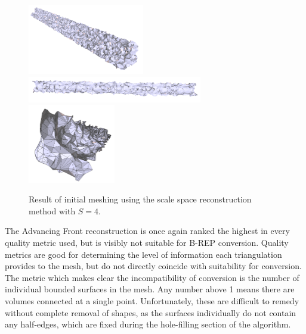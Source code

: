 \documentclass[12pt]{drexelthesis}
\begin{document}
\begin{figure}[!ht]
	
	\centering
		\includegraphics[width=2in]{simulated-lab-scan/2cmnoise/2cmmesh/scalespace400.png}
		\includegraphics[width=3in]{simulated-lab-scan/2cmnoise/2cmmesh/scalespace401.png}
		\includegraphics[width=1.5in]{simulated-lab-scan/2cmnoise/2cmmesh/scalespace402.png}
		\caption[Initial meshing using a scale space reconstruction with $S = 4$]{\centering  Result of initial meshing using the scale space reconstruction method with $S = 4$.}
		\label{2cmnoise:scalespace4}
\end{figure}

The Advancing Front reconstruction is once again ranked the highest in every quality metric used, but is visibly not suitable for B-REP conversion. Quality metrics are good for determining the level of information each triangulation provides to the mesh, but do not directly coincide with suitability for conversion. The metric which makes clear the incompatibility of conversion is the number of individual bounded surfaces in the mesh. Any number above 1 means there are volumes connected at a single point. Unfortunately, these are difficult to remedy without complete removal of shapes, as the surfaces individually do not contain any half-edges, which are fixed during the hole-filling section of the algorithm.
\end{document}
